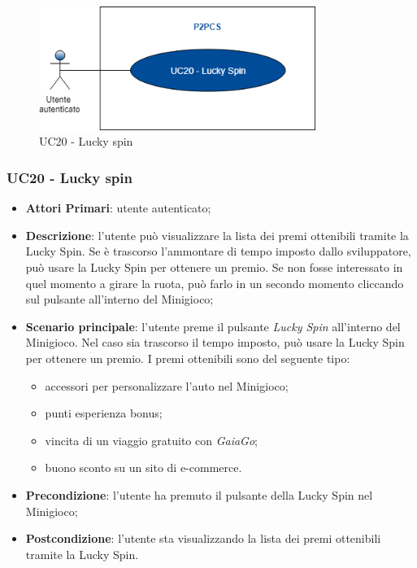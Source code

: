 \begin{figure}[h]
	\includegraphics[width=9cm]{res/images/UC20Luckyspin.png}
	\centering
	\caption{UC20 - Lucky spin}
\end{figure}
\subsubsection{UC20 - Lucky spin}
\begin{itemize}
	\item \textbf{Attori Primari}: utente autenticato;
	\item \textbf{Descrizione}:	l'utente può visualizzare la lista dei premi ottenibili tramite la Lucky Spin\glo. Se è trascorso l'ammontare di tempo imposto dallo sviluppatore, può usare la Lucky Spin per ottenere un premio. Se non fosse interessato in quel momento a girare la ruota, può farlo in un secondo momento cliccando sul pulsante all'interno del Minigioco;
	\item \textbf{Scenario principale}: l'utente preme il pulsante \textit{Lucky Spin} all'interno del Minigioco. Nel caso sia trascorso il tempo imposto, può usare la Lucky Spin per ottenere un premio. I premi ottenibili sono del seguente tipo:
	\begin{itemize}
		\item accessori per personalizzare l'auto nel Minigioco;
		\item punti esperienza bonus;
		\item vincita di un viaggio gratuito con \textit{GaiaGo};
		\item buono sconto su un sito di e-commerce.	
	\end{itemize}
	\item \textbf{Precondizione}: l'utente ha premuto il pulsante della Lucky Spin nel Minigioco;
	\item \textbf{Postcondizione}: l'utente sta visualizzando la lista dei premi ottenibili tramite la Lucky Spin.
\end{itemize}
